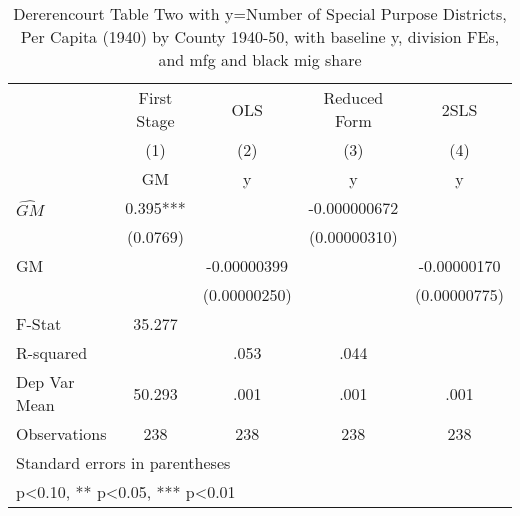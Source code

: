\begin{table}[htbp]\centering
\def\sym#1{\ifmmode^{#1}\else\(^{#1}\)\fi}
\caption{Dererencourt Table Two with y=Number of Special Purpose Districts, Per Capita (1940) by County 1940-50, with baseline y, division FEs, and mfg and black mig share}
\begin{tabular}{l*{4}{c}}
\toprule
                    & First Stage   &         OLS   &Reduced Form   &        2SLS   \\
                    &\multicolumn{1}{c}{(1)}&\multicolumn{1}{c}{(2)}&\multicolumn{1}{c}{(3)}&\multicolumn{1}{c}{(4)}\\
                    &\multicolumn{1}{c}{GM}&\multicolumn{1}{c}{y}&\multicolumn{1}{c}{y}&\multicolumn{1}{c}{y}\\
\midrule
$\hat{GM}$          &       0.395***&               &-0.000000672   &               \\
                    &    (0.0769)   &               &(0.00000310)   &               \\
\addlinespace
GM                  &               & -0.00000399   &               & -0.00000170   \\
                    &               &(0.00000250)   &               &(0.00000775)   \\
\midrule
F-Stat              &      35.277   &               &               &               \\
R-squared           &               &        .053   &        .044   &               \\
Dep Var Mean        &      50.293   &        .001   &        .001   &        .001   \\
Observations        &         238   &         238   &         238   &         238   \\
\bottomrule
\multicolumn{5}{l}{\footnotesize Standard errors in parentheses}\\
\multicolumn{5}{l}{\footnotesize * p<0.10, ** p<0.05, *** p<0.01}\\
\end{tabular}
\end{table}
